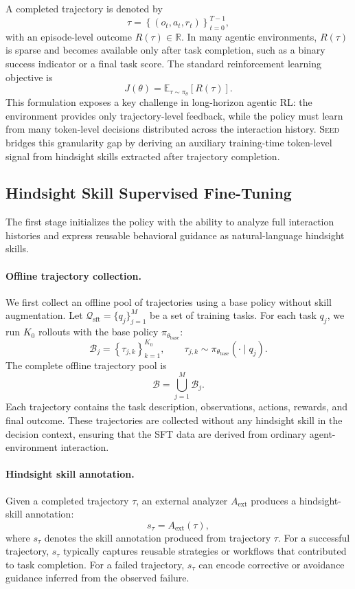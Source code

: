 A completed trajectory is denoted by
\[
\tau =
\left\{
(o_t, a_t, r_t)
\right\}_{t=0}^{T-1},
\]
with an episode-level outcome $R(\tau) \in \mathbb{R}$. In many agentic environments, $R(\tau)$ is sparse and becomes available only after task completion, such as a binary success indicator or a final task score. The standard reinforcement learning objective is
\[
J(\theta)
=
\mathbb{E}_{\tau \sim \pi_\theta}
\left[
R(\tau)
\right].
\]
This formulation exposes a key challenge in long-horizon agentic RL: the environment provides only trajectory-level feedback, while the policy must learn from many token-level decisions distributed across the interaction history. \textsc{Seed} bridges this granularity gap by deriving an auxiliary training-time token-level signal from hindsight skills extracted after trajectory completion.

\subsection{Hindsight Skill Supervised Fine-Tuning}
The first stage initializes the policy with the ability to analyze full interaction histories and express reusable behavioral guidance as natural-language hindsight skills.

\paragraph{Offline trajectory collection.}
We first collect an offline pool of trajectories using a base policy without skill augmentation. Let $\mathcal{Q}_{\mathrm{sft}} = \{q_j\}_{j=1}^{M}$ be a set of training tasks. For each task $q_j$, we run $K_0$ rollouts with the base policy $\pi_{\theta_{\mathrm{base}}}$:
\[
\mathcal{B}_j
=
\left\{
\tau_{j,k}
\right\}_{k=1}^{K_0},
\qquad
\tau_{j,k}
\sim
\pi_{\theta_{\mathrm{base}}}
\left(
\cdot \mid q_j
\right).
\]
The complete offline trajectory pool is
\[
\mathcal{B}
=
\bigcup_{j=1}^{M}
\mathcal{B}_j.
\]
Each trajectory contains the task description, observations, actions, rewards, and final outcome. These trajectories are collected without any hindsight skill in the decision context, ensuring that the SFT data are derived from ordinary agent-environment interaction.

\paragraph{Hindsight skill annotation.}
Given a completed trajectory $\tau$, an external analyzer $A_{\mathrm{ext}}$ produces a hindsight-skill annotation:
\[
s_\tau
=
A_{\mathrm{ext}}
\left(
\tau
\right),
\]
where $s_\tau$ denotes the skill annotation produced from trajectory $\tau$. For a successful trajectory, $s_{\tau}$ typically captures reusable strategies or workflows that contributed to task completion. For a failed trajectory, $s_\tau$ can encode corrective or avoidance guidance inferred from the observed failure.

